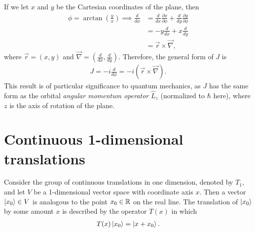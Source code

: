     If we let $x$ and $y$ be the Cartesian coordinates of the plane, then
    \begin{align*}
        \phi = \arctan\left(\frac{y}{x}\right) \implies \frac{d}{d\phi} 
            &= \frac{d}{dx}\frac{\partial x}{\partial \phi} + \frac{d}{dy}\frac{\partial y}{\partial \phi} \\
            &= -y\frac{d}{dx} + x\frac{d}{dy} \\
            &= \vec{r}\times\vec{\nabla},
    \end{align*}
    where $\vec{r} = (x,y)$ and $\vec{\nabla} = \left(\frac{d}{dx},\frac{d}{dy}\right)$. Therefore, the general form of $J$ is
    \begin{align*}
        J = -i \frac{d}{d\phi} = -i \left( \vec{r}\times\vec{\nabla} \right).
    \end{align*}
    This result is of particular significance to quantum mechanics, as $J$ has the same form as the orbital \textit{angular momentum operator} $\hat{L}_z$ (normalized to $\hbar$ here), where $z$ is the axis of rotation of the plane.
    

    \section{Continuous 1-dimensional translations}

    Consider the group of continuous translations in one dimension, denoted by $T_1$, and let $V$ be a 1-dimensional vector space with coordinate axis $x$. Then a vector $\ket{x_0}\in V$ is analogous to the point $x_0\in\mathbb{R}$ on the real line. The translation of $\ket{x_0}$ by some amount $x$ is described by the operator $T(x)$ in which
    \begin{align*}
        T(x)\ket{x_0} = \ket{x+x_0}.
    \end{align*}

